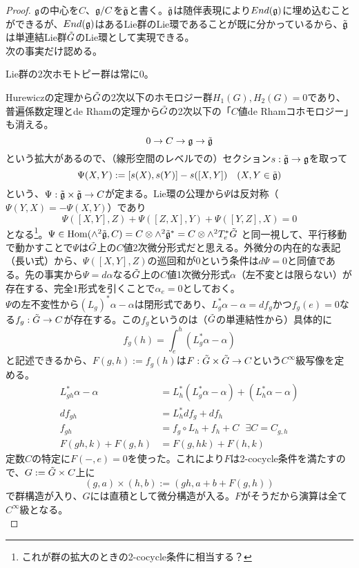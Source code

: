 \begin{proof}
    $\mathfrak{g}$の中心を$C$、$\mathfrak{g}/C$を$\Tilde{\mathfrak{g}}$と書く。$\Tilde{\mathfrak{g}}$は随伴表現により$End(\mathfrak{g})$に埋め込むことができるが、$End(\mathfrak{g})$はあるLie群のLie環であることが既に分かっているから、$\Tilde{\mathfrak{g}}$は単連結Lie群$\Tilde{G}$のLie環として実現できる。\\
    次の事実だけ認める。
    \begin{fact}
        Lie群の2次ホモトピー群は常に0。
    \end{fact}
    Hurewiczの定理から$\Tilde{G}$の2次以下のホモロジー群$H_1(G),H_2(G)=0$であり、普遍係数定理とde Rhamの定理から$\Tilde{G}$の2次以下の「$C$値de Rhamコホモロジー」も消える。
    \[0\to C\to \mathfrak{g}\to\Tilde{\mathfrak{g}}\]
    という拡大があるので、（線形空間のレベルでの）セクション$s:\Tilde{\mathfrak{g}}\to\mathfrak{g}$を取って
    \[\Psi(X,Y):=[s(X),s(Y)]-s([X,Y])\ \ \ (X,Y\in\Tilde{\g})\]
    という、$\Psi:\Tilde{\mathfrak{g}}\times\Tilde{\mathfrak{g}}\to C$が定まる。Lie環の公理から$\Psi$は反対称（$\Psi(Y,X)=-\Psi(X,Y)$）であり
    \[\Psi([X,Y],Z)+\Psi([Z,X],Y)+\Psi([Y,Z],X)=0\]
    となる\footnote{これが群の拡大のときの2-cocycle条件に相当する？}。$\Psi\in\mathrm{Hom}(\wedge^2\Tilde{\mathfrak{g}},C)=C\otimes\wedge^2\Tilde{\mathfrak{g}}^*=C\otimes\wedge^2 T^*_e\Tilde{G}$ と同一視して、平行移動で動かすことで$\Psi$は$\Tilde{G}$上の$C$値2次微分形式だと思える。外微分の内在的な表記（長い式）から、$\Psi([X,Y],Z)$の巡回和が0という条件は$d\Psi=0$と同値である。先の事実から$\Psi=d\alpha$なる$\Tilde{G}$上の$C$値1次微分形式$\alpha$（左不変とは限らない）が存在する、完全1形式を引くことで$\alpha_e=0$としておく。\\
    $\Psi$の左不変性から$(L_g)^*\alpha-\alpha$は閉形式であり、$L_g^*\alpha-\alpha=df_g$かつ$f_g(e)=0$なる$f_g:\Tilde{G}\to C$が存在する。この$f_g$というのは（$\Tilde{G}$の単連結性から）具体的に
    \[f_g(h)=\int_e^h (L_g^*\alpha-\alpha)\]
    と記述できるから、$F(g,h):=f_g(h)$は$F:\Tilde{G}\times\Tilde{G}\to C$という$C^\infty$級写像を定める。
    \begin{align*}
        L_{gh}^*\alpha-\alpha &= L_h^*(L_g^*\alpha-\alpha)+(L_h^*\alpha-\alpha)\\
        df_{gh} &= L_h^*df_g+df_h\\
        f_{gh} &= f_g\circ L_h + f_h +C\ \ \ \exists C=C_{g,h}\\
        F(gh,k)+F(g,h) &= F(g,hk)+F(h,k)
    \end{align*}
    定数$C$の特定に$F(-,e)=0$を使った。これにより$F$は2-cocycle条件を満たすので、$G:=\Tilde{G}\times C$上に
    \[(g,a)\times(h,b):=(gh,a+b+F(g,h))\]
    で群構造が入り、$G$には直積として微分構造が入る。$F$がそうだから演算は全て$C^\infty$級となる。\\

\end{proof}
